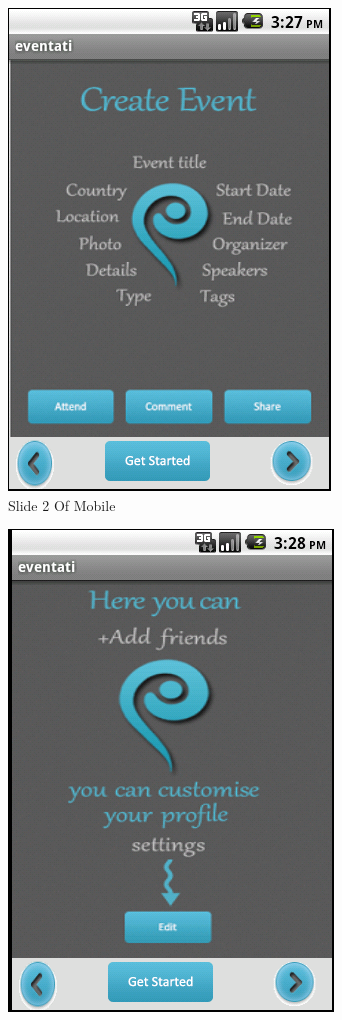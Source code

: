 \documentclass[12pt,a4paper,class,twoside,openany]{report}
\begin{document}
{\begin{figure}
\begin{minipage}[b]{0.5\linewidth}
	\includegraphics[width=\textwidth]{8-14}
	\caption{Slide 2 Of Mobile }
	\label{fg:8-14}
	\end{minipage}
	\end{figure}
	\begin{figure}
	\begin{minipage}[b]{0.5\linewidth}
	\centering
	\includegraphics[height=4 in]{8-15}

\end{minipage}
\end{figure}}
\end{document}

